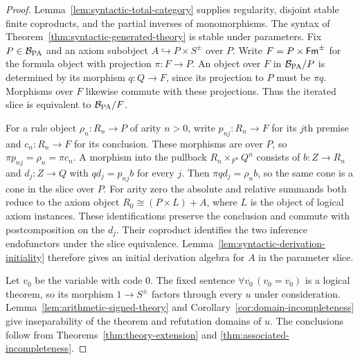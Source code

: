 \begin{proof}
Lemma~\ref{lem:syntactic-total-category} supplies regularity,
disjoint stable finite coproducts, and the partial inverses of
monomorphisms. The syntax of Theorem~\ref{thm:syntactic-generated-theory}
is stable under parameters. Fix $P\in\mathcal B_{\mathrm{PA}}$ and an axiom
subobject $A\hookrightarrow P\times S^{\pm}$ over $P$. Write $F=P\times\mathsf{Fm}^{\pm}$
for the formula object with projection $\pi:F\to P$.
An object over $F$ in $\mathcal B_{\mathrm{PA}}/P$ is determined by its
morphism $q:Q\to F$, since its projection to $P$ must be $\pi q$.
Morphisms over $F$ likewise commute with these projections. Thus the
iterated slice is equivalent to $\mathcal B_{\mathrm{PA}}/F$.

For a rule object $\rho_n:R_n\to P$ of arity $n>0$, write
$p_{nj}:R_n\to F$ for its $j$th premise and $c_n:R_n\to F$ for
its conclusion. These morphisms are over $P$, so
$\pi p_{nj}=\rho_n=\pi c_n$. A morphism into the pullback
$R_n\times_{F^n}Q^n$ consists of $b:Z\to R_n$ and
$d_j:Z\to Q$ with $qd_j=p_{nj}b$ for every $j$. Then
$\pi qd_j=\rho_n b$, so the same cone is a cone in the slice over $P$.
For arity zero the absolute and relative summands both reduce to
the axiom object $R_0\cong(P\times L)+A$, where $L$ is the object of logical axiom
instances. These identifications preserve the conclusion and commute
with postcomposition on the $d_j$. Their coproduct identifies the two
inference endofunctors under the slice equivalence.
Lemma~\ref{lem:syntactic-derivation-initiality} therefore gives an
initial derivation algebra for $A$ in the parameter slice.

Let $v_0$ be the variable
with code $0$. The fixed sentence
$\forall v_0\,(v_0=v_0)$ is a logical theorem, so its morphism
$1\to S^{\pm}$ factors through every $u$ under consideration.
Lemma~\ref{lem:arithmetic-signed-theory} and
Corollary~\ref{cor:domain-incompleteness} give inseparability of
the theorem and refutation domains of $u$.
The conclusions follow from
Theorems~\ref{thm:theory-extension} and
\ref{thm:associated-incompleteness}.
\end{proof}

